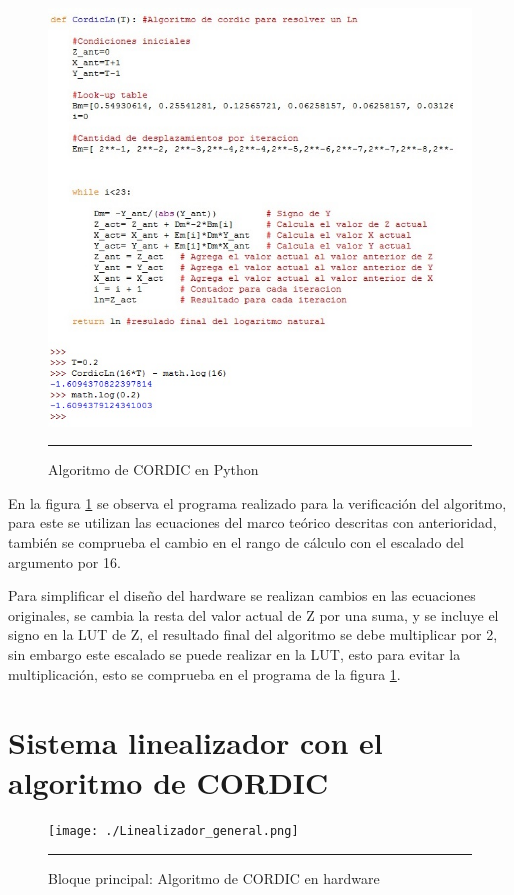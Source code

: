 \begin{figure}[H]
  \centering
    \includegraphics[scale=0.6]{./Progra_Cordic.jpg}
    \rule{35em}{0.5pt}
  \caption[Algoritmo de CORDIC en Python]{Algoritmo de CORDIC en Python  }
  \label{fig:Python}
\end{figure}


En la figura \ref{fig:Python} se observa el programa realizado para la verificación del algoritmo, para este se utilizan las ecuaciones del marco teórico descritas con anterioridad, también se comprueba el cambio en el rango de cálculo con el escalado del argumento por 16. 

Para simplificar el diseño del hardware se realizan cambios en las ecuaciones originales, se cambia la resta del valor actual de Z por una suma, y se incluye el signo en la LUT de Z, el resultado final del algoritmo se debe multiplicar por 2, sin embargo este escalado se puede realizar en la LUT, esto para evitar la multiplicación, esto se comprueba en el programa de la figura \ref{fig:Python}.  


\section{Sistema linealizador con el algoritmo de CORDIC}

\begin{figure}[H]
  \centering
    \texttt{[image: ./Linealizador\_general.png]}
    \rule{35em}{0.5pt}
  \caption[Bloque principal: algoritmo de CORDIC en hardware]{Bloque principal: Algoritmo de CORDIC en hardware  }
  \label{fig:CORDIC1}
\end{figure}

